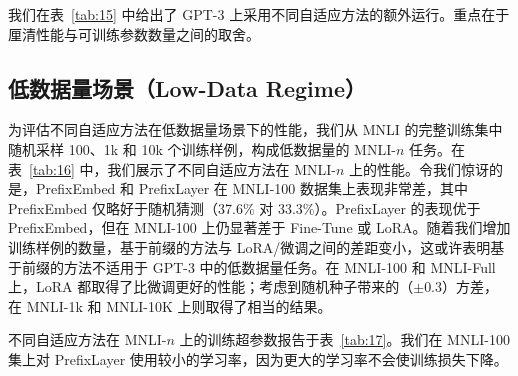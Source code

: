 \documentclass[11pt,UTF8,fontset=fandol]{ctexart}
\begin{document}
我们在表~\ref{tab:15} 中给出了 GPT-3 上采用不同自适应方法的额外运行。重点在于厘清性能与可训练参数数量之间的取舍。

\subsection{低数据量场景（Low-Data Regime）}

为评估不同自适应方法在低数据量场景下的性能，我们从 MNLI 的完整训练集中随机采样 100、1k 和 10k 个训练样例，构成低数据量的 MNLI-$n$ 任务。在表~\ref{tab:16} 中，我们展示了不同自适应方法在 MNLI-$n$ 上的性能。令我们惊讶的是，PrefixEmbed 和 PrefixLayer 在 MNLI-100 数据集上表现非常差，其中 PrefixEmbed 仅略好于随机猜测（37.6\% 对 33.3\%）。PrefixLayer 的表现优于 PrefixEmbed，但在 MNLI-100 上仍显著差于 Fine-Tune 或 LoRA。随着我们增加训练样例的数量，基于前缀的方法与 LoRA/微调之间的差距变小，这或许表明基于前缀的方法不适用于 GPT-3 中的低数据量任务。在 MNLI-100 和 MNLI-Full 上，LoRA 都取得了比微调更好的性能；考虑到随机种子带来的（$\pm0.3$）方差，在 MNLI-1k 和 MNLI-10K 上则取得了相当的结果。

不同自适应方法在 MNLI-$n$ 上的训练超参数报告于表~\ref{tab:17}。我们在 MNLI-100 集上对 PrefixLayer 使用较小的学习率，因为更大的学习率不会使训练损失下降。
\end{document}
